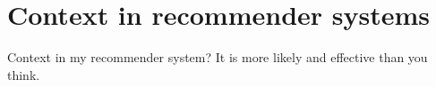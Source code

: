 \section{Context in recommender systems}
Context in my recommender system? It is more likely and effective than you think.